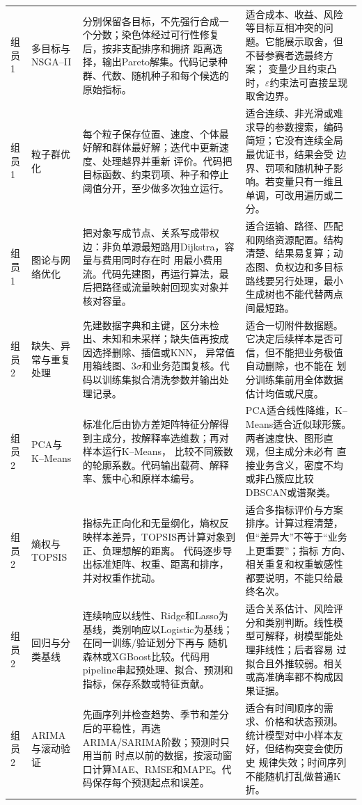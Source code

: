 \documentclass[UTF8,zihao=-4]{ctexart}
\begin{document}
\begin{longtable}{p{1.25cm}p{2.55cm}p{6.25cm}p{5.45cm}}
组员1 & 多目标与NSGA--II
& 分别保留各目标，不先强行合成一个分数；染色体经过可行性修复后，按非支配排序和拥挤
距离选择，输出Pareto解集。代码记录种群、代数、随机种子和每个候选的原始指标。
& 适合成本、收益、风险等目标互相冲突的问题。它能展示取舍，但不替参赛者选最终方案；
变量少且约束凸时，$\varepsilon$约束法可直接呈现取舍边界。\\

组员1 & 粒子群优化
& 每个粒子保存位置、速度、个体最好解和群体最好解；迭代中更新速度、处理越界并重新
评价。代码把目标函数、约束罚项、种子和停止阈值分开，至少做多次独立运行。
& 适合连续、非光滑或难求导的参数搜索，编码简短；它没有连续全局最优证书，结果会受
边界、罚项和随机种子影响。若变量只有一维且单调，可改用遍历或二分。\\

组员1 & 图论与网络优化
& 把对象写成节点、关系写成带权边：非负单源最短路用Dijkstra，容量与费用同时存在时
用最小费用流。代码先建图，再运行算法，最后把路径或流量映射回现实对象并核对容量。
& 适合运输、路径、匹配和网络资源配置。结构清楚、结果易复算；动态图、负权边和多目标
路线要另行处理，最小生成树也不能代替两点间最短路。\\

组员2 & 缺失、异常与重复处理
& 先建数据字典和主键，区分未检出、未知和未采样；缺失值再按成因选择删除、插值或KNN，
异常值用箱线图、$3\sigma$和业务范围复核。代码以训练集拟合清洗参数并输出处理记录。
& 适合一切附件数据题。它决定后续样本是否可信，但不能把业务极值自动删除，也不能在
划分训练集前用全体数据估计均值或尺度。\\

组员2 & PCA与K--Means
& 标准化后由协方差矩阵特征分解得到主成分，按解释率选维数；再对样本运行K--Means，
比较不同簇数的轮廓系数。代码输出载荷、解释率、簇中心和原样本编号。
& PCA适合线性降维，K--Means适合近似球形簇。两者速度快、图形直观，但主成分未必有
直接业务含义，密度不均或非凸簇应比较DBSCAN或谱聚类。\\

组员2 & 熵权与TOPSIS
& 指标先正向化和无量纲化，熵权反映样本差异，TOPSIS再计算对象到正、负理想解的距离。
代码逐步导出标准矩阵、权重、距离和排序，并对权重作扰动。
& 适合多指标评价与方案排序。计算过程清楚，但“差异大”不等于“业务上更重要”；指标
方向、相关重复和权重敏感性都要说明，不能只给最终名次。\\

组员2 & 回归与分类基线
& 连续响应以线性、Ridge和Lasso为基线，类别响应以Logistic为基线；在同一训练/验证划分下再与
随机森林或XGBoost比较。代码用pipeline串起预处理、拟合、预测和指标，保存系数或特征贡献。
& 适合关系估计、风险评分和类别判断。线性模型可解释，树模型能处理非线性；后者容易
过拟合且外推较弱。相关或高准确率都不构成因果证据。\\

组员2 & ARIMA与滚动验证
& 先画序列并检查趋势、季节和差分后的平稳性，再选ARIMA/SARIMA阶数；预测时只用当前
时点以前的数据，按滚动窗口计算MAE、RMSE和MAPE。代码保存每个预测起点和误差。
& 适合有时间顺序的需求、价格和状态预测。统计模型对中小样本友好，但结构突变会使历史
规律失效；时间序列不能随机打乱做普通K折。\\
\end{longtable}
\normalsize
\end{document}
